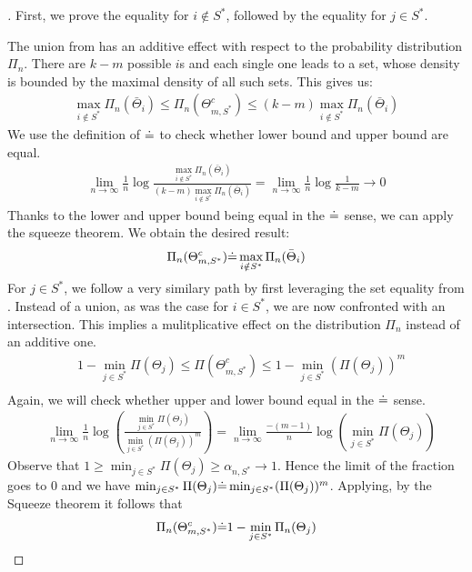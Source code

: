 \begin{proof}[]
  First, we prove the equality for $i \notin S^*$, followed by the equality for $j \in S^*$.

  The union from  has an additive effect with respect to the probability distribution $\Pi_n$. There are $k-m$ possible $i$s and each single one leads to a set, whose density is bounded by the maximal density of all such sets. This gives us:
  \begin{align}
    \max_{i \notin S^*} \Pi_n(\bar{\Theta}_i) \leq \Pi_n(\Theta_{m, S^*}^c) \leq (k-m) \max_{i \notin S^*} \Pi_n(\bar{\Theta}_i)
  \end{align}
  We use the definition of $\dot{=}$ to check whether lower bound and upper bound are equal.
  \begin{align}
    \lim_{n \rightarrow \infty} \frac{1}{n} \log{\frac{\max_{i \notin S^*} \Pi_n(\bar{\Theta}_i)}{(k-m)\max_{i \notin S^*} \Pi_n(\bar{\Theta}_i)}}
    = \lim_{n \rightarrow \infty} \frac{1}{n} \log{\frac{1}{k-m}} \rightarrow 0
  \end{align}
  Thanks to the lower and upper bound being equal in the $\dot{=}$ sense, we can apply the squeeze theorem. We obtain the desired result:
  \begin{align}
    \Pi_n(\Theta_{m, S^*}^c) \dot{=} \max_{i \notin S^*} \Pi_n(\bar{\Theta}_i)
  \end{align}
  For $j \in S^*$, we follow a very similary path by first leveraging the set equality from . Instead of a union, as was the case for $i \in S^*$, we are now confronted with an intersection. This implies a mulitplicative effect on the distribution $\Pi_n$ instead of an additive one.
  \begin{align}
    &1 - \min_{j \in S^*} \Pi(\Theta_j) \leq \Pi(\Theta_{m, S^*}^c) \leq 1 - \min_{j \in S^*} (\Pi(\Theta_j))^m \\
  \end{align}
  Again, we will check whether upper and lower bound equal in the $\dot{=}$ sense.
  \begin{align}
    &\lim_{n \rightarrow \infty} \frac{1}{n} \log(\frac{\min_{j \in S^*} \Pi(\Theta_j)}{\min_{j \in S^*} (\Pi(\Theta_j))^m}) = \lim_{n \rightarrow \infty} \frac{-(m - 1)}{n} \log(\min_{j \in S^*} \Pi(\Theta_j))
  \end{align}
  Observe that $1 \geq \min_{j \in S^*} \Pi(\Theta_j) \geq \alpha_{n, S^*} \rightarrow 1$. Hence the limit of the fraction goes to 0 and we have $\min_{j \in S^*} \Pi(\Theta_j) \dot{=} \min_{j \in S^*} (\Pi(\Theta_j))^m$. Applying, by the Squeeze theorem it follows that
  \begin{align}
    \Pi_n(\Theta_{m, S^*}^c) \dot{=} 1 - \min_{j \in S^*} \Pi_n(\Theta_j)
  \end{align}
\end{proof}

